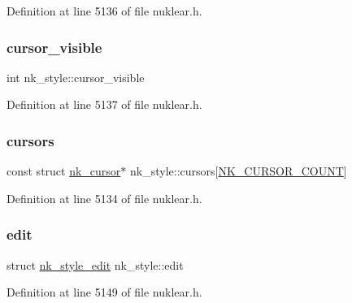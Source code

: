 Definition at line 5136 of file nuklear.\+h.

\mbox{\label{structnk__style_a9ee1b418ab830430d317d9a4e06f4f98}} 
\subsubsection{\texorpdfstring{cursor\+\_\+visible}{cursor\_visible}}
{\footnotesize\ttfamily int nk\+\_\+style\+::cursor\+\_\+visible}



Definition at line 5137 of file nuklear.\+h.

\mbox{\label{structnk__style_aba31682e1e6dba96e52fcbdb750be34c}} 
\subsubsection{\texorpdfstring{cursors}{cursors}}
{\footnotesize\ttfamily const struct \mbox{\hyperlink{structnk__cursor}{nk\+\_\+cursor}}$\ast$ nk\+\_\+style\+::cursors\mbox{[}\mbox{\hyperlink{nuklear_8h_ac83d70db962be55fde890e491d190213a87299462a55125531df5f9aa8c99fadf}{N\+K\+\_\+\+C\+U\+R\+S\+O\+R\+\_\+\+C\+O\+U\+NT}}\mbox{]}}



Definition at line 5134 of file nuklear.\+h.

\mbox{\label{structnk__style_a2e6872e44b048d5e562994b0f9acc4eb}} 
\subsubsection{\texorpdfstring{edit}{edit}}
{\footnotesize\ttfamily struct \mbox{\hyperlink{structnk__style__edit}{nk\+\_\+style\+\_\+edit}} nk\+\_\+style\+::edit}



Definition at line 5149 of file nuklear.\+h.

\mbox{\label{structnk__style_aab136e535cc1d11d40e8b2fd18060c5d}} 
